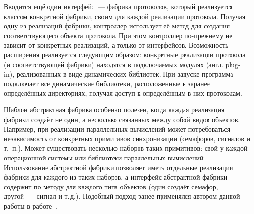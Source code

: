\documentclass[a4paper, 14pt, titlepage]{extarticle}
\newcommand{\eng}[1]{\foreignlanguage{english}{#1}}
\newenvironment{myfigure}[2]%
    {\pushQED{\caption{#1} \label{#2}} %
     \begin{figure}[!htb]\centering } %
    {  \popQED %
     \end{figure}}
\begin{document}
  \begin{myfigure}{Абстрактная фабрика протоколов}{fig:abstract-factory}
  \end{myfigure}

  Вводится ещё один интерфейс~--- фабрика протоколов, который реализуется классом конкретной
  фабрики, своим для каждой реализации протокола. Получая одну из реализаций фабрики, контроллер
  использует её метод для создания соответствующего объекта протокола. При этом контроллер
  по-прежнему не зависит от конкретных реализаций, а только от интерфейсов.
  Возможность расширения реализуется следующим образом: конкретные реализации протокола (и
  соответствующей фабрики) находятся в подключаемых модулях (англ. \eng{plug-in}), реализованных в
  виде динамических библиотек. При запуске программа подключает все динамические библиотеки,
  расположенные в заранее определённых директориях, получая доступ к определённым в них протоколам.

  Шаблон абстрактная фабрика особенно полезен, когда каждая реализация фабрики создаёт не один, а
  несколько связанных между собой видов объектов. Например, при реализации параллельных вычислений
  может потребоваться независимость от конкретных примитивов синхронизации (семафоров, сигналов и
  т.~п.). Может существовать несколько наборов таких примитивов: свой у каждой операционной системы
  или библиотеки параллельных вычислений. Использование абстрактной фабрики позволяет иметь
  отдельные реализации фабрики для каждого из таких наборов, а интерфейс абстрактной фабрики
  содержит по методу для каждого типа объектов (один создаёт семафор, другой~--- сигнал и т.\,д.).
  Подобный подход ранее применялся автором данной работы в работе~\cite{nia-mnsk-11}.
\end{document}
